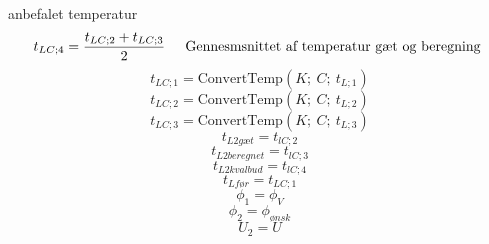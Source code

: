 \documentclass[../Hovedrapport.tex]{subfiles}
\newcommand{\I}{\mbox{\hspace{0.20in}}}
\begin{document}
\vspace{0.10in}
\noindent
\rm anbefalet temperatur
\begin{equation}
\label{EES Eqn:79}
t_{LC;4} = \frac {t_{LC;2} + t_{LC;3}}{ 2	 } 
\mbox{\I Gennesmsnittet af temperatur gæt og beregning }
\end{equation}
\begin{equation}
\label{EES Eqn:80}
t_{LC;1} = \mbox{ConvertTemp}{ \left( K;\ C;\ t_{L;1} \right) } 
\end{equation}
\begin{equation}
\label{EES Eqn:81}
t_{LC;2} = \mbox{ConvertTemp}{ \left( K;\ C;\ t_{L;2} \right) } 
\end{equation}
\begin{equation}
\label{EES Eqn:82}
t_{LC;3} = \mbox{ConvertTemp}{ \left( K;\ C;\ t_{L;3} \right) } 
\end{equation}
\begin{equation}
\label{EES Eqn:83}
t_{L2gæt} = t_{lC;2} 
\end{equation}
\begin{equation}
\label{EES Eqn:84}
t_{L2beregnet} = t_{lC;3} 
\end{equation}
\begin{equation}
\label{EES Eqn:85}
t_{L2kvalbud} = t_{lC;4} 
\end{equation}
\begin{equation}
\label{EES Eqn:86}
t_{Lfør} = t_{LC;1} 
\end{equation}
\begin{equation}
\label{EES Eqn:87}
\phi_{1} = \phi_{V} 
\end{equation}
\begin{equation}
\label{EES Eqn:88}
\phi_{2} = \phi_{ønsk} 
\end{equation}
\begin{equation}
\label{EES Eqn:89}
U_{2} = U 
\end{equation}
\end{document}
